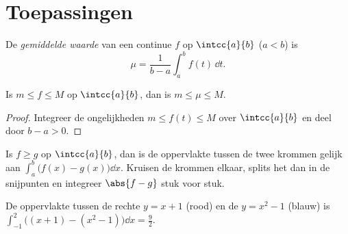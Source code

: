 \section{Toepassingen}

\begin{definition}\label{def:g12:integ:mean}
De \emph{gemiddelde waarde} van een continue 
$f$ op $\intcc{a}{b}$ ($a<b$) is
\[
\mu = \frac{1}{b-a}\int_a^b f(t)\,\dd t .
\]
\end{definition}

\begin{proposition}\label{prop:g12:integ:meanbounds}
Is $m \leq f \leq M$ op $\intcc{a}{b}$, dan is $m \leq \mu \leq M$.
\end{proposition}

\begin{proof}
Integreer de ongelijkheden $m \leq f(t) \leq M$ over $\intcc{a}{b}$ en deel
door $b - a > 0$.
\end{proof}

\begin{method}\label{met:g12:integ:areabetween}
Is $f \geq g$ op $\intcc{a}{b}$, dan is de oppervlakte tussen de twee krommen
gelijk aan $\int_a^b \bigl(f(x) - g(x)\bigr)\dd x$. Kruisen de krommen elkaar,
splits het  dan in de snijpunten en integreer $\abs{f - g}$ stuk voor
stuk.
\end{method}

\begin{omfigure}

{\small De oppervlakte tussen de rechte $y = x + 1$ (rood) en de 
$y = x^2 - 1$ (blauw) is $\int_{-1}^{2}
\bigl((x+1) - (x^2-1)\bigr)\dd x = \frac92$.}
\end{omfigure}

